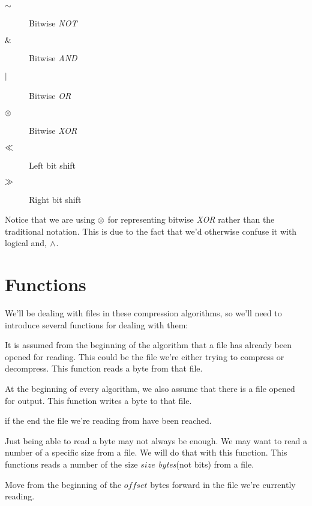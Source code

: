 \begin{description}
\item[$\mathord{\sim}$] Bitwise \textit{NOT}
\item[$\mathrel{\&}$] Bitwise \textit{AND}
\item[$\mathrel{|}$] Bitwise \textit{OR}
\item[$\mathrel{\otimes}$] Bitwise \textit{XOR}
\item[$\ll$] Left bit shift
\item[$\gg$] Right bit shift
\end{description}

Notice that we are using $\mathrel{\otimes}$ for representing bitwise
\textit{XOR} rather than the traditional \C{} notation. This is due to
the fact that we'd otherwise confuse it with logical and, $\wedge$.

\section{Functions}
\label{sec:pseudocode}

We'll be dealing with files in these compression algorithms, so we'll
need to introduce several functions for dealing with them:

\begin{description}[font=\normalfont]
\item[\textproc{ReadByte}] It is assumed from the beginning of the
  algorithm that a file has already been opened for reading. This
  could be the file we're either trying to compress or
  decompress. This function reads a byte from that file.

\item[\Call{WriteByte}{$byte$}] At the beginning of every algorithm,
  we also assume that there is a file opened for output. This function
  writes a byte to that file.

\item[\textproc{EndOfFileReached}] \True{} if the end the file we're
  reading from have been reached.

\item[\Call{Read}{$size$}] Just being able to read a byte may not
  always be enough. We may want to read a number of a specific size
  from a file. We will do that with this function. This functions
  reads a number of the size $size$ \textit{bytes}(not bits) from a
  file.

\item[\Call{Seek}{$offset$}] Move from the beginning of the $offset$
  bytes forward in the file we're currently reading.


\end{description}

